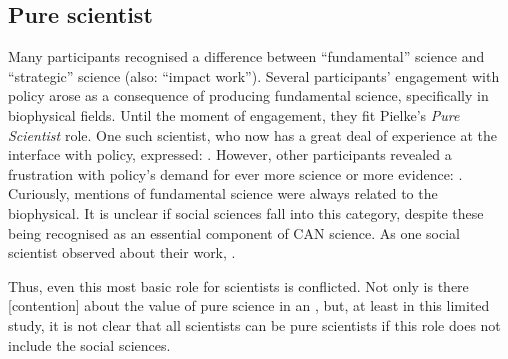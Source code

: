 \subsection{Pure scientist}
Many participants recognised a difference between ``fundamental'' science and ``strategic'' science (also: ``impact work''). Several participants' engagement with policy arose as a consequence of producing fundamental science, specifically in biophysical fields. Until the moment of engagement, they fit Pielke's \emph{Pure Scientist} role.  One such scientist, who now has a great deal of experience at the interface with policy, expressed: . However, other participants revealed a frustration with policy's demand for ever more science or more evidence: .
Curiously, mentions of fundamental science were always related to the biophysical. It is unclear if social sciences fall into this category, despite these being recognised as an essential component of CAN science. As one social scientist observed about their work, .

Thus, even this most basic role for scientists is conflicted. Not only is there [contention] about the value of pure science in an , but, at least in this limited study, it is not clear that all scientists can be pure scientists if this role does not include the social sciences. %



